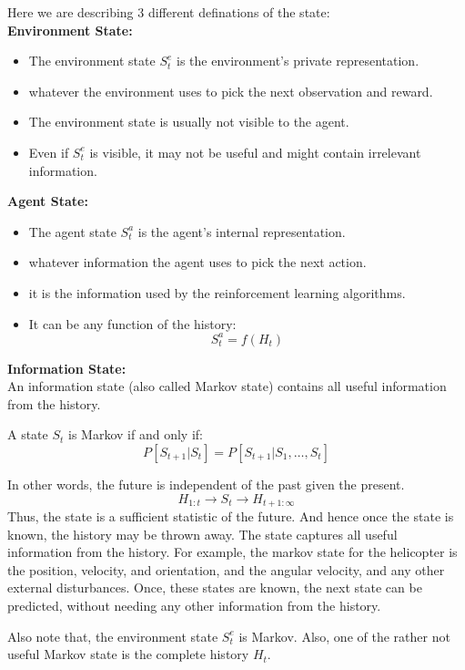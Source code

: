 Here we are describing 3 different definations of the state:\\
\textbf{Environment State: }
\begin{itemize}
    \item The environment state \(S_t^e\) is the environment's private representation.
    \item whatever the environment uses to pick the next observation and reward. 
    \item The environment state is usually not visible to the agent.
    \item Even if \(S_t^e\) is visible, it may not be useful and might contain irrelevant information.
\end{itemize}
\textbf{Agent State:}
\begin{itemize}
    \item The agent state \(S_t^a\) is the agent's internal representation.
    \item whatever information the agent uses to pick the next action.
    \item it is the information used by the reinforcement learning algorithms.
    \item It can be any function of the history:
    \[
        S_t^a = f(H_t)  
    \]
\end{itemize}
\textbf{Information State:}\\
An information state (also called Markov state) contains all useful information from the history.
\begin{definition}
    A state \(S_t\) is Markov if and only if:
    \[
        P[S_{t+1} | S_t] = P[S_{t+1} | S_1, \dots, S_t]  
    \]
\end{definition}
In other words, the future is independent of the past given the present.
\[
    H_{1:t} \to S_t \to H_{t+1:\infty}
\]
Thus, the state is a sufficient statistic of the future. And hence once the state is known, the history
may be thrown away. The state captures all useful information from the history.
For example, the markov state for the helicopter is the position, velocity, and orientation, and the
angular velocity, and any other external disturbances. Once, these states are known, the next 
state can be predicted, without needing any other information from the history.

Also note that, the environment state \(S_t^e\) is Markov. Also, one of the rather not useful Markov
state is the complete history \(H_t\).  